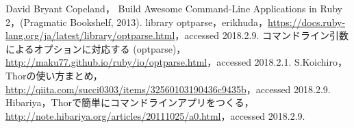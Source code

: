 
\begin{thebibliography}{9}
  David Bryant Copeland， Build Awesome Command-Line Applications
in Ruby 2，(Pragmatic Bookshelf, 2013).
 library optparse，erikhuda，\url{https://docs.ruby-lang.org/ja/latest/library/optparse.html}，accessed 2018.2.9.
 コマンドライン引数によるオプションに対応する (optparse)， \url{http://maku77.github.io/ruby/io/optparse.html}，accessed 2018.2.1.
 S.Koichiro，Thorの使い方まとめ，\url{http://qiita.com/succi0303/items/32560103190436c9435b}，accessed 2018.2.9.
 Hibariya，Thorで簡単にコマンドラインアプリをつくる， \url{http://note.hibariya.org/articles/20111025/a0.html}，accessed 2018.2.9.
\end{thebibliography}


    

